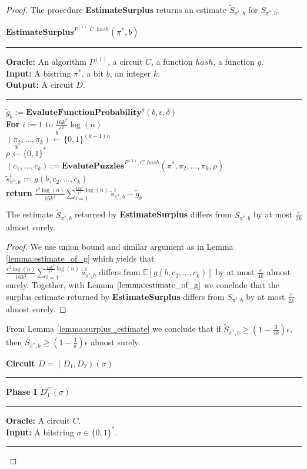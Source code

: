 \begin{proof}
The procedure \textbf{EstimateSurplus} returns an estimate $\widetilde{S}_{\pi^*, b}$ for $S_{\pi^*, b}$.
%
\begin{codeblock}
  $\textbf{EstimateSurplus}^{P^{(1)}, C, hash}(\pi^*, b)$
  \medskip
  \hrule
  \medskip
  \textbf{Oracle:} An algorithm $P^{(1)}$, a circuit $C$, a function $hash$, a function $g$.\\
  \textbf{Input:} A bistring $\pi^*$, a bit $b$, an integer $k$.\\
  \textbf{Output:} A circuit $D$.
  \medskip\hrule\medskip
  $\widetilde{g}_b := \textbf{EvaluteFunctionProbability}^{g}(b, \epsilon, \delta)$ \\
  \textbf{For} $i:=1$ to $\frac{16k^2}{\epsilon^2}\log(n)$ \Do \\
  \IndI $(\pi_{2}, \dots, \pi_k) \xleftarrow{\$} \{0,1\}^{(k-1)n}$\\
  \IndI $\rho \xleftarrow{\$} \{0,1\}^{*}$\\
  \IndI $(c_1, \dots, c_k) := \textbf{EvalutePuzzles}^{P^{(1)}, C, hash}(\pi^*, \pi_2, \dots, \pi_k, \rho)$\\
  \IndI $\widetilde{s}_{\pi^*,b}^i := g(b, c_{2}, \dots, c_k)$\\
  \textbf{return} $\frac{\epsilon^2\log(n)}{16k^2} \sum_{i=1}^{\frac{16k^2}{\epsilon^2}\log(n)} \widetilde{s}_{\pi^*,b}^i - \widetilde{g}_b$\\
\end{codeblock}
%
\begin{lemma}
  \label{lemma:surplus_estimate}
The estimate $\widetilde{S}_{\pi^*,b}$ returned by \textbf{EstimateSurplus} differs from $S_{\pi^*, b}$ by at most $\frac{\epsilon}{2k}$ almost surely.
\end{lemma}

\begin{proof}
We use union bound and similar argument as in Lemma \ref{lemma:estimate_of_g}
which yields that \\$\frac{\epsilon^2\log(n)}{16k^2} \sum_{i=1}^{\frac{16k^2}{\epsilon^2}\log(n)} \widetilde{s}_{\pi^*,b}^i$ differs from
$\mathbb{E}[g(b, c_2, \dots, c_k)]$ by at most $\frac{\epsilon}{4k}$ almost surely. Together, with Lemma $\ref{lemma:estimate_of_g}$ we conclude that the surplus estimate
returned by \textbf{EstimateSurplus} differs from $S_{\pi^*,b}$ by at most $\frac{\epsilon}{2k}$ almost surely.
\end{proof}
From Lemma \ref{lemma:surplus_estimate} we conclude that if $\widetilde{S}_{\pi^*,b} \geq (1-\frac{3}{4k})\epsilon$, then $S_{\pi^*,b} \geq (1-\frac{1}{k})\epsilon$ almost surely.
%
\begin{codeblock}
  \textbf{Circuit $D = (D_1, D_2) (\sigma)$}
  \medskip \hrule \medskip
  \textbf{Phase I $D_1^{C}(\sigma)$}
  \medskip \hrule \medskip
  \textbf{Oracle:} A circuit $C$.\\
  \textbf{Input:} A bitstring $\sigma \in \{0,1\}^{*}$.
  \medskip\hrule\medskip


\end{codeblock}
\end{proof}
